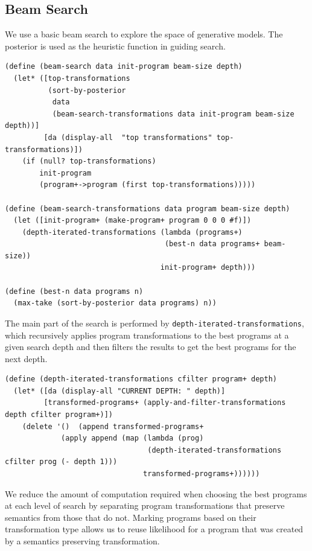 \documentclass[a4paper,10pt]{article}
\begin{document}
\subsection{Beam Search}
We use a basic beam search to explore the space of generative models.  The posterior is used as the heuristic function in guiding search.
\begin{lstlisting}[frame=trBL]
(define (beam-search data init-program beam-size depth)
  (let* ([top-transformations 
          (sort-by-posterior
           data 
           (beam-search-transformations data init-program beam-size depth))]
         [da (display-all  "top transformations" top-transformations)])
    (if (null? top-transformations)
        init-program
        (program+->program (first top-transformations)))))

(define (beam-search-transformations data program beam-size depth)
  (let ([init-program+ (make-program+ program 0 0 0 #f)])
    (depth-iterated-transformations (lambda (programs+) 
                                     (best-n data programs+ beam-size)) 
                                    init-program+ depth)))

(define (best-n data programs n)
  (max-take (sort-by-posterior data programs) n))
\end{lstlisting}
The main part of the search is performed by \texttt{depth-iterated-transformations}, which recursively applies program transformations to the best programs at a given search depth and then filters the results to get the best programs for the next depth.
\begin{lstlisting}[frame=trBL]
(define (depth-iterated-transformations cfilter program+ depth)
  (let* ([da (display-all "CURRENT DEPTH: " depth)]
         [transformed-programs+ (apply-and-filter-transformations depth cfilter program+)])
    (delete '()  (append transformed-programs+
             (apply append (map (lambda (prog) 
                                 (depth-iterated-transformations cfilter prog (- depth 1))) 
                                transformed-programs+))))))
\end{lstlisting}
We reduce the amount of computation required when choosing the best programs at each level of search by separating program transformations that preserve semantics from those that do not.  Marking programs based on their transformation type allows us to reuse likelihood for a program that was created by a semantics preserving transformation.
\end{document}
